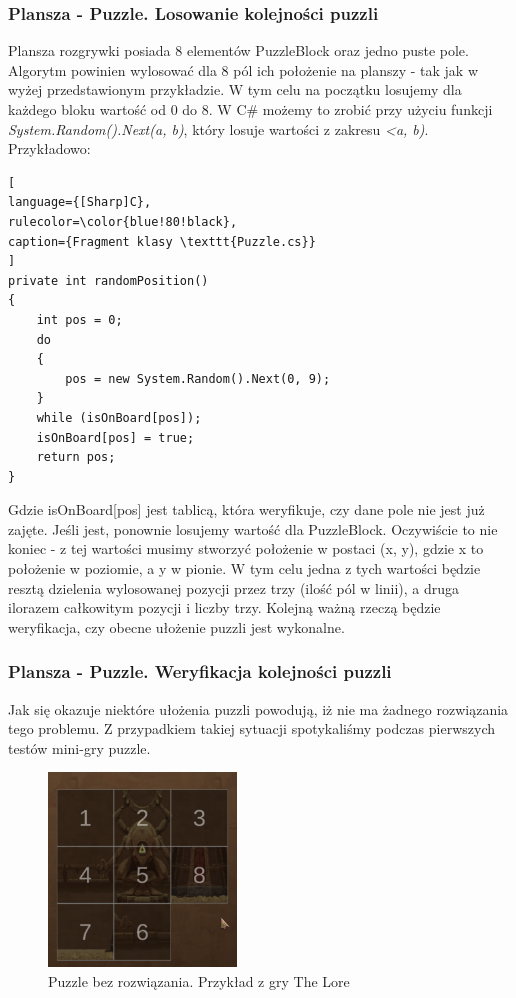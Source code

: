 \documentclass[oneside,polski,logo]{amuthesis}
\begin{document}
\subsubsection{Plansza - Puzzle. Losowanie kolejności puzzli}
	Plansza rozgrywki posiada 8 elementów PuzzleBlock oraz jedno puste pole.  Algorytm powinien wylosować dla 8 pól ich położenie na planszy - tak jak w wyżej przedstawionym przykładzie. W tym celu na początku losujemy dla każdego bloku wartość od 0 do 8. W C\# możemy to zrobić przy użyciu funkcji  \emph{System.Random().Next(a, b)}, który losuje wartości z zakresu \emph{<a, b)}. Przykładowo:
\begin{lstlisting}[
language={[Sharp]C},
rulecolor=\color{blue!80!black},
caption={Fragment klasy \texttt{Puzzle.cs}}
]
private int randomPosition()
{
    int pos = 0;
    do
    {
        pos = new System.Random().Next(0, 9);
    }
    while (isOnBoard[pos]);
    isOnBoard[pos] = true;
    return pos;
}
\end{lstlisting}

Gdzie isOnBoard[pos] jest tablicą, która weryfikuje, czy dane pole nie jest już zajęte. Jeśli jest, ponownie losujemy wartość dla PuzzleBlock. Oczywiście to nie koniec - z tej wartości musimy stworzyć położenie w postaci (x, y), gdzie x to położenie w poziomie, a y w pionie. W tym celu jedna z tych wartości będzie resztą dzielenia wylosowanej pozycji przez trzy (ilość pól w linii), a druga ilorazem całkowitym pozycji i liczby trzy. 
Kolejną ważną rzeczą będzie weryfikacja, czy obecne ułożenie puzzli jest wykonalne.

\subsubsection{Plansza - Puzzle. Weryfikacja kolejności puzzli}
Jak się okazuje niektóre ułożenia puzzli powodują, iż nie ma żadnego rozwiązania tego problemu. Z przypadkiem takiej sytuacji spotykaliśmy podczas pierwszych testów mini-gry puzzle. 
\begin{figure}[h]
	\centering
	\includegraphics[width=5cm]{images/tyrek/puzzle_1.png}
	\caption{Puzzle bez rozwiązania. Przykład z gry The Lore}
\end{figure}
\end{document}
